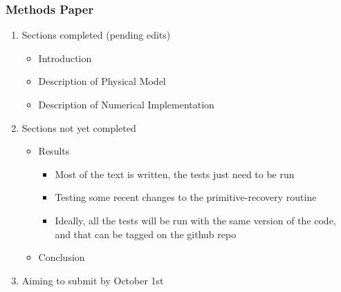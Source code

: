 \documentclass{beamer}
\begin{document}
\begin{frame}
\frametitle{Methods Paper}

  \begin{enumerate}
    \item
      Sections completed (pending edits)
      \begin{itemize}
        \item
          Introduction
        \item
          Description of Physical Model
        \item
          Description of Numerical Implementation
      \end{itemize}
    \item
      Sections not yet completed
      \begin{itemize}
        \item
          Results
          \begin{itemize}
            \item
              Most of the text is written, the tests just need to be run
            \item
              Testing some recent changes to the primitive-recovery routine
            \item
              Ideally, all the tests will be run with the same version
              of the code, and that can be tagged on the github repo
          \end{itemize}
        \item
          Conclusion
      \end{itemize}
    \item
      Aiming to submit by October 1st
  \end{enumerate}

\end{frame}
\end{document}
